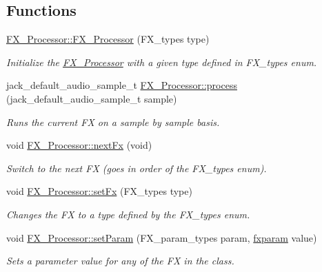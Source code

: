 \subsection*{Functions}
\begin{DoxyCompactItemize}
\item 
\hyperlink{group__fx_ga7ca5d9ae276fae16385774dd650a463b}{F\+X\+\_\+\+Processor\+::\+F\+X\+\_\+\+Processor} (F\+X\+\_\+types type)
\begin{DoxyCompactList}\small\item\em Initialize the \hyperlink{class_f_x___processor}{F\+X\+\_\+\+Processor} with a given type defined in F\+X\+\_\+types enum. \end{DoxyCompactList}\item 
jack\+\_\+default\+\_\+audio\+\_\+sample\+\_\+t \hyperlink{group__fx_ga28c21e02acafee81891aa7a841a9eb2b}{F\+X\+\_\+\+Processor\+::process} (jack\+\_\+default\+\_\+audio\+\_\+sample\+\_\+t sample)
\begin{DoxyCompactList}\small\item\em Runs the current F\+X on a sample by sample basis. \end{DoxyCompactList}\item 
void \hyperlink{group__fx_ga3db35d06ad4816d43fdee58396a2aa8e}{F\+X\+\_\+\+Processor\+::next\+Fx} (void)
\begin{DoxyCompactList}\small\item\em Switch to the next F\+X (goes in order of the F\+X\+\_\+types enum). \end{DoxyCompactList}\item 
void \hyperlink{group__fx_ga5e82105e6948cefc5dd0233e55c2afe0}{F\+X\+\_\+\+Processor\+::set\+Fx} (F\+X\+\_\+types type)
\begin{DoxyCompactList}\small\item\em Changes the F\+X to a type defined by the F\+X\+\_\+types enum. \end{DoxyCompactList}\item 
void \hyperlink{group__fx_ga02c602d1dd654bc0115b2a600bd3937f}{F\+X\+\_\+\+Processor\+::set\+Param} (F\+X\+\_\+param\+\_\+types param, \hyperlink{group__fx_ga206aa2d2b25bdca17a838a03412b11f7}{fxparam} value)
\begin{DoxyCompactList}\small\item\em Sets a parameter value for any of the F\+X in the class. \end{DoxyCompactList}\end{DoxyCompactItemize}


